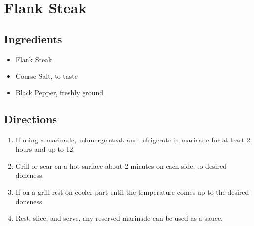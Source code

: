 \section{Flank Steak}

\subsection{ Ingredients }

\begin{itemize}
  \item <2 lb> Flank Steak
  \item <2 tsp> Course Salt, to taste
  \item <2 tsp> Black Pepper, freshly ground
\end{itemize}

\subsection{ Directions }

\begin{enumerate}
  \item If using a marinade, submerge steak and refrigerate in marinade for at least 2 hours and up to 12. 
  \item Grill or sear on a hot surface about 2 minutes on each side, to desired doneness. 
  \item If on a grill rest on cooler part until the temperature comes up to the desired doneness. 
  \item Rest, slice, and serve, any reserved marinade can be used as a sauce. 
\end{enumerate}
